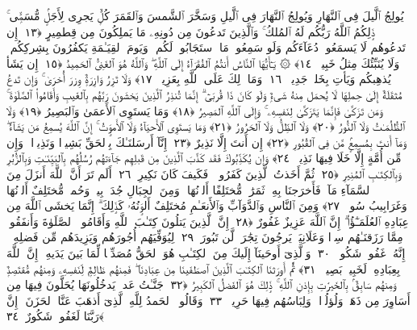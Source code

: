  يُولِجُ ٱلَّيلَ فِى ٱلنَّهَارِ وَيُولِجُ ٱلنَّهَارَ فِى ٱلَّيلِ وَسَخَّرَ ٱلشَّمسَ وَٱلقَمَرَ كُلٌّۭ يَجرِى لِأَجَلٍۢ مُّسَمًّۭى ۚ ذَٟلِكُمُ ٱللَّهُ رَبُّكُم لَهُ ٱلمُلكُ ۚ وَٱلَّذِينَ تَدعُونَ مِن دُونِهِۦ مَا يَملِكُونَ مِن قِطمِيرٍ ﴿١٣﴾
 إِن تَدعُوهُم لَا يَسمَعُوا۟ دُعَآءَكُم وَلَو سَمِعُوا۟ مَا ٱستَجَابُوا۟ لَكُم ۖ وَيَومَ ٱلقِيَـٰمَةِ يَكفُرُونَ بِشِركِكُم ۚ وَلَا يُنَبِّئُكَ مِثلُ خَبِيرٍۢ ﴿١٤﴾
 ۞ يَـٰٓأَيُّهَا ٱلنَّاسُ أَنتُمُ ٱلفُقَرَآءُ إِلَى ٱللَّهِ ۖ وَٱللَّهُ هُوَ ٱلغَنِىُّ ٱلحَمِيدُ ﴿١٥﴾
 إِن يَشَأ يُذهِبكُم وَيَأتِ بِخَلقٍۢ جَدِيدٍۢ ﴿١٦﴾
 وَمَا ذَٟلِكَ عَلَى ٱللَّهِ بِعَزِيزٍۢ ﴿١٧﴾
 وَلَا تَزِرُ وَازِرَةٌۭ وِزرَ أُخرَىٰ ۚ وَإِن تَدعُ مُثقَلَةٌ إِلَىٰ حِملِهَا لَا يُحمَل مِنهُ شَىءٌۭ وَلَو كَانَ ذَا قُربَىٰٓ ۗ إِنَّمَا تُنذِرُ ٱلَّذِينَ يَخشَونَ رَبَّهُم بِٱلغَيبِ وَأَقَامُوا۟ ٱلصَّلَوٰةَ ۚ وَمَن تَزَكَّىٰ فَإِنَّمَا يَتَزَكَّىٰ لِنَفسِهِۦ ۚ وَإِلَى ٱللَّهِ ٱلمَصِيرُ ﴿١٨﴾
 وَمَا يَستَوِى ٱلأَعمَىٰ وَٱلبَصِيرُ ﴿١٩﴾
 وَلَا ٱلظُّلُمَـٰتُ وَلَا ٱلنُّورُ ﴿٢٠﴾
 وَلَا ٱلظِّلُّ وَلَا ٱلحَرُورُ ﴿٢١﴾
 وَمَا يَستَوِى ٱلأَحيَآءُ وَلَا ٱلأَموَٟتُ ۚ إِنَّ ٱللَّهَ يُسمِعُ مَن يَشَآءُ ۖ وَمَآ أَنتَ بِمُسمِعٍۢ مَّن فِى ٱلقُبُورِ ﴿٢٢﴾
 إِن أَنتَ إِلَّا نَذِيرٌ ﴿٢٣﴾
 إِنَّآ أَرسَلنَـٰكَ بِٱلحَقِّ بَشِيرًۭا وَنَذِيرًۭا ۚ وَإِن مِّن أُمَّةٍ إِلَّا خَلَا فِيهَا نَذِيرٌۭ ﴿٢٤﴾
 وَإِن يُكَذِّبُوكَ فَقَد كَذَّبَ ٱلَّذِينَ مِن قَبلِهِم جَآءَتهُم رُسُلُهُم بِٱلبَيِّنَـٰتِ وَبِٱلزُّبُرِ وَبِٱلكِتَـٰبِ ٱلمُنِيرِ ﴿٢٥﴾
 ثُمَّ أَخَذتُ ٱلَّذِينَ كَفَرُوا۟ ۖ فَكَيفَ كَانَ نَكِيرِ ﴿٢٦﴾
 أَلَم تَرَ أَنَّ ٱللَّهَ أَنزَلَ مِنَ ٱلسَّمَآءِ مَآءًۭ فَأَخرَجنَا بِهِۦ ثَمَرَٰتٍۢ مُّختَلِفًا أَلوَٟنُهَا ۚ وَمِنَ ٱلجِبَالِ جُدَدٌۢ بِيضٌۭ وَحُمرٌۭ مُّختَلِفٌ أَلوَٟنُهَا وَغَرَابِيبُ سُودٌۭ ﴿٢٧﴾
 وَمِنَ ٱلنَّاسِ وَٱلدَّوَآبِّ وَٱلأَنعَـٰمِ مُختَلِفٌ أَلوَٟنُهُۥ كَذَٟلِكَ ۗ إِنَّمَا يَخشَى ٱللَّهَ مِن عِبَادِهِ ٱلعُلَمَـٰٓؤُا۟ ۗ إِنَّ ٱللَّهَ عَزِيزٌ غَفُورٌ ﴿٢٨﴾
 إِنَّ ٱلَّذِينَ يَتلُونَ كِتَـٰبَ ٱللَّهِ وَأَقَامُوا۟ ٱلصَّلَوٰةَ وَأَنفَقُوا۟ مِمَّا رَزَقنَـٰهُم سِرًّۭا وَعَلَانِيَةًۭ يَرجُونَ تِجَٰرَةًۭ لَّن تَبُورَ ﴿٢٩﴾
 لِيُوَفِّيَهُم أُجُورَهُم وَيَزِيدَهُم مِّن فَضلِهِۦٓ ۚ إِنَّهُۥ غَفُورٌۭ شَكُورٌۭ ﴿٣٠﴾
 وَٱلَّذِىٓ أَوحَينَآ إِلَيكَ مِنَ ٱلكِتَـٰبِ هُوَ ٱلحَقُّ مُصَدِّقًۭا لِّمَا بَينَ يَدَيهِ ۗ إِنَّ ٱللَّهَ بِعِبَادِهِۦ لَخَبِيرٌۢ بَصِيرٌۭ ﴿٣١﴾
 ثُمَّ أَورَثنَا ٱلكِتَـٰبَ ٱلَّذِينَ ٱصطَفَينَا مِن عِبَادِنَا ۖ فَمِنهُم ظَالِمٌۭ لِّنَفسِهِۦ وَمِنهُم مُّقتَصِدٌۭ وَمِنهُم سَابِقٌۢ بِٱلخَيرَٰتِ بِإِذنِ ٱللَّهِ ۚ ذَٟلِكَ هُوَ ٱلفَضلُ ٱلكَبِيرُ ﴿٣٢﴾
 جَنَّـٰتُ عَدنٍۢ يَدخُلُونَهَا يُحَلَّونَ فِيهَا مِن أَسَاوِرَ مِن ذَهَبٍۢ وَلُؤلُؤًۭا ۖ وَلِبَاسُهُم فِيهَا حَرِيرٌۭ ﴿٣٣﴾
 وَقَالُوا۟ ٱلحَمدُ لِلَّهِ ٱلَّذِىٓ أَذهَبَ عَنَّا ٱلحَزَنَ ۖ إِنَّ رَبَّنَا لَغَفُورٌۭ شَكُورٌ ﴿٣٤﴾
